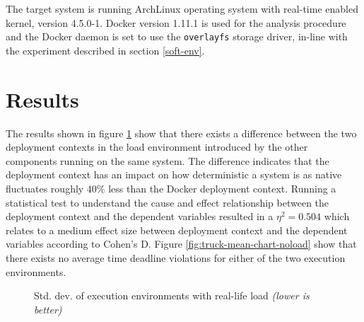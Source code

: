 The target system is running ArchLinux operating system with real-time enabled kernel, version 4.5.0-1. Docker version 1.11.1 is used for the analysis procedure and the Docker daemon is set to use the \texttt{overlayfs} storage driver, in-line with the experiment described in section \ref{soft-env}.

\section{Results}

The results shown in figure \ref{fig:truck-std-chart-noload} show that there exists a difference between the two deployment contexts in the load environment introduced by the other components running on the same system. The difference indicates that the deployment context has an impact on how deterministic a system is as native fluctuates roughly $40\%$ less than the Docker deployment context. Running a statistical test to understand the cause and effect relationship between the deployment context and the dependent variables resulted in a $\eta^{2}=0.504$ which relates to a medium effect size between deployment context and the dependent variables according to Cohen's D. Figure \ref{fig:truck-mean-chart-noload} show that there exists no average time deadline violations for either of the two execution environments.


\mydatanoload
\begin{figure}[H]
\caption{Std. dev. of execution environments with real-life load \textit{(lower is better)}}
\label{fig:truck-std-chart-noload}
\end{figure}



